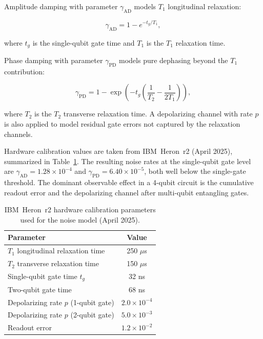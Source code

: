 \documentclass[10pt,conference]{IEEEtran}
\begin{document}
Amplitude damping with parameter $\gamma_\text{AD}$ models $T_1$
longitudinal relaxation:

\begin{equation}
  \gamma_\text{AD} = 1 - e^{-t_g / T_1},
  \label{eq:ad}
\end{equation}

where $t_g$ is the single-qubit gate time and $T_1$ is the $T_1$
relaxation time.

Phase damping with parameter $\gamma_\text{PD}$ models pure dephasing
beyond the $T_1$ contribution:

\begin{equation}
  \gamma_\text{PD} = 1 - \exp\!\left(-t_g \left(\frac{1}{T_2} - \frac{1}{2T_1}\right)\right),
  \label{eq:pd}
\end{equation}

where $T_2$ is the $T_2$ transverse relaxation time. A depolarizing
channel with rate $p$ is also applied to model residual gate errors
not captured by the relaxation channels.

Hardware calibration values are taken from IBM~Heron~r2 (April 2025),
summarized in Table~\ref{tab:noise}. The resulting noise rates at the
single-qubit gate level are $\gamma_\text{AD} = 1.28 \times 10^{-4}$
and $\gamma_\text{PD} = 6.40 \times 10^{-5}$, both well below the
single-gate threshold. The dominant observable effect in a 4-qubit
circuit is the cumulative readout error and the depolarizing channel
after multi-qubit entangling gates.

\begin{table}[ht]
\centering
\caption{IBM~Heron~r2 hardware calibration parameters used for the
  noise model (April 2025).}
\label{tab:noise}
\begin{tabular}{lc}
\toprule
\textbf{Parameter} & \textbf{Value} \\
\midrule
$T_1$ longitudinal relaxation time    & 250 $\mu$s \\
$T_2$ transverse relaxation time      & 150 $\mu$s \\
Single-qubit gate time $t_g$          & 32 ns \\
Two-qubit gate time                   & 68 ns \\
Depolarizing rate $p$ (1-qubit gate)  & $2.0 \times 10^{-4}$ \\
Depolarizing rate $p$ (2-qubit gate)  & $5.0 \times 10^{-3}$ \\
Readout error                         & $1.2 \times 10^{-2}$ \\
\bottomrule
\end{tabular}
\end{table}
\end{document}
